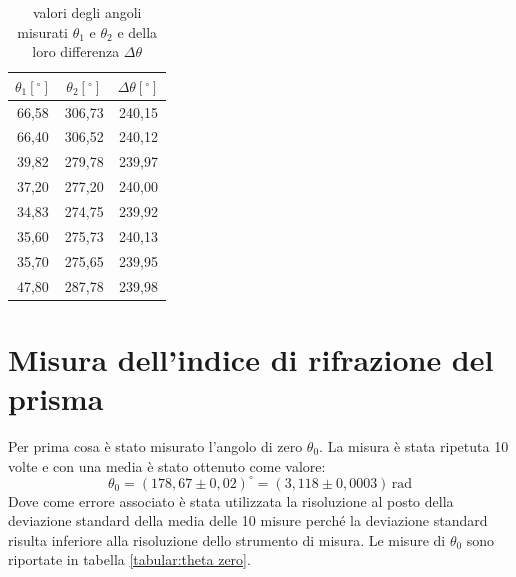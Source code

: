 \documentclass{article}
\begin{document}
        \begin{table}[H]

            \centering
            \begin{tabular}{c c c}

                \toprule 
                $\theta_1 [^\circ]$ & $\theta_2 [^\circ]$  & $\Delta\theta [^\circ]$  \\
                
                \midrule
                66,58	&	306,73	&	240,15\\
                66,40	&	306,52	&	240,12\\
                39,82	&	279,78	&	239,97\\
                37,20	&	277,20	&	240,00\\
                34,83	&	274,75	&	239,92\\				
                35,60	&	275,73	&	240,13\\				
                35,70	&	275,65	&	239,95\\
                47,80	&	287,78	&	239,98\\
                \bottomrule

            \end{tabular}

            \caption{valori degli angoli misurati $\theta_1$ e $\theta_2$ e della loro differenza $\Delta\theta$}
            \label{tabular:delta theta}

        \end{table}


    \section{Misura dell'indice di rifrazione del prisma}

        Per prima cosa è stato misurato l'angolo di zero $\theta_0$. La misura è stata ripetuta 10 volte e con una media è stato ottenuto come valore:
        \[ \theta_0 = (178,67\pm 0,02) ^\circ = (3,118 \pm 0,0003)\, \mathrm{rad} \]
        Dove come errore associato è stata utilizzata la risoluzione al posto della  deviazione standard della media delle 10 misure 
        perché la deviazione standard risulta inferiore alla risoluzione dello strumento di misura. 
        Le misure di $\theta_0$ sono riportate in tabella \ref{tabular:theta zero}.
            
\end{document}

